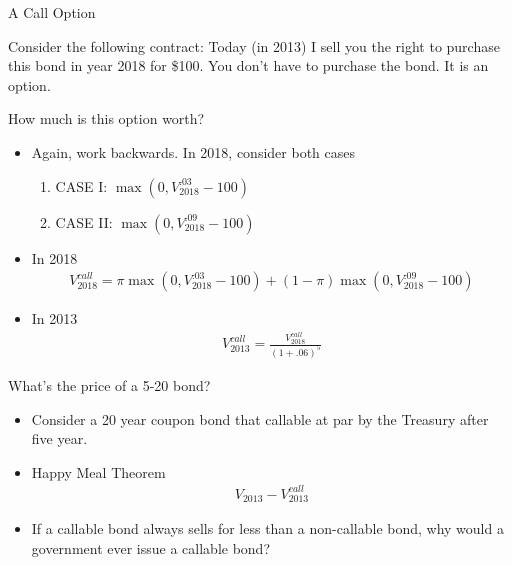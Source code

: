 \documentclass[professionalfonts,small]{beamer}
\begin{document}
\begin{frame}{A Call Option}

\footnotesize

Consider the following contract: Today (in 2013) I sell you the right to purchase this bond in year 2018 for \$100.
You don't have to purchase the bond.  It is an option.

\bigskip
How much is this option worth?
\begin{itemize}
\item Again, work backwards.  In 2018, consider both cases
\begin{enumerate}
\item CASE I:  $ \max(0, V_{2018}^{.03} - 100) $
\item CASE II: $ \max(0, V_{2018}^{.09} - 100) $
\end{enumerate}

\item In 2018
\begin{eqnarray*}
V_{2018}^{call} = \pi \max(0, V_{2018}^{.03} - 100) + (1-\pi) \max(0, V_{2018}^{.09} - 100)
\end{eqnarray*}

\item In 2013
\begin{eqnarray*}
V_{2013}^{call}  = \frac{V_{2018}^{call}}{(1+.06)^5}
\end{eqnarray*}

\end{itemize}
\end{frame}

\begin{frame}{What's the price of a 5-20 bond?}

\begin{itemize}

\item Consider a 20 year coupon bond that callable at par by the Treasury after five year.

\medskip

\item Happy Meal Theorem
\begin{eqnarray*}
V_{2013} - V_{2013}^{call}
\end{eqnarray*}

\medskip

\item If a callable bond always sells for less than a non-callable bond, why would a government ever issue a callable bond?

\end{itemize}

\end{frame}
\end{document}

